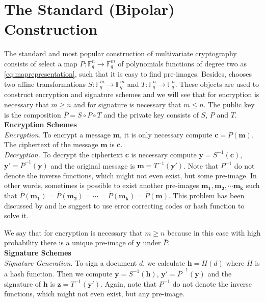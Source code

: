 \section{The Standard (Bipolar) Construction}
The standard and most popular construction of multivariate cryptography consists of select a map $P\colon\mathbb{F}_q^{n}\rightarrow \mathbb{F}_q^{m}$ of polynomials functions of degree two as \eqref{eq:maprepresentation}, such that it is easy to find pre-images. Besides, chooses two affine transformations $S\colon\mathbb{F}_q^{m}\rightarrow \mathbb{F}_q^{m}$ and $T\colon\mathbb{F}_q^{n}\rightarrow \mathbb{F}_q^{n}$. These objects are used to construct encryption and signature schemes and we will see that for encryption is necessary that $m\geq n$ and for signature is necessary that $m\leq n$. The public key is the composition $\bar{P} = S \circ P \circ T$ and the private key consists of $S$, $P$ and $T$.\\
\noindent
\textbf{Encryption Schemes}\\
\noindent
\textit{Encryption.} To encrypt a message $\boldsymbol{m}$, it is only necessary compute $\boldsymbol{c} = \bar{P}(\boldsymbol{m})$. The ciphertext of the message $\boldsymbol{m}$ is $\boldsymbol{c}$.\\
\noindent
\textit{Decryption.} To decrypt the ciphertext $\boldsymbol{c}$ is necessary compute $\boldsymbol{y} = S^{-1}(\boldsymbol{c})$, $\boldsymbol{y'} = \bar{P}^{-1}(\boldsymbol{y})$ and the original message is $\boldsymbol{m} = T^{-1}(\boldsymbol{y'})$. Note that $P^{-1}$ do not denote the inverse functions, which might not even exist, but some pre-image. In other words, sometimes is possible to exist another pre-images $\boldsymbol{m_1}, \boldsymbol{m_2}, \cdots \boldsymbol{m_k}$ such that $\bar{P}(\boldsymbol{m_1}) = \bar{P}(\boldsymbol{m_2}) = \cdots = \bar{P}(\boldsymbol{m_k}) = \bar{P}(\boldsymbol{m})$. This problem has been discussed by \cite{Patarin1996} and he suggest to use error correcting codes or hash function to solve it. 

We say that for encryption is necessary that $m\geq n$ because in this case with high probability there is a unique pre-image of $\boldsymbol{y}$ under $\bar{P}$.\\
\noindent
\textbf{Signature Schemes}\\
\noindent
\textit{Signature Generation.} To sign a document $d$, we calculate $\boldsymbol{h} = H(d)$ where $H$ is a hash function. Then we compute $\boldsymbol{y} = S^{-1}(\boldsymbol{h})$, $\boldsymbol{y'} = \bar{P}^{-1}(\boldsymbol{y})$ and the signature of $\boldsymbol{h}$ is $\boldsymbol{z} = T^{-1}(\boldsymbol{y'})$. Again, note that $P^{-1}$ do not denote the inverse functions, which might not even exist, but any pre-image. 

